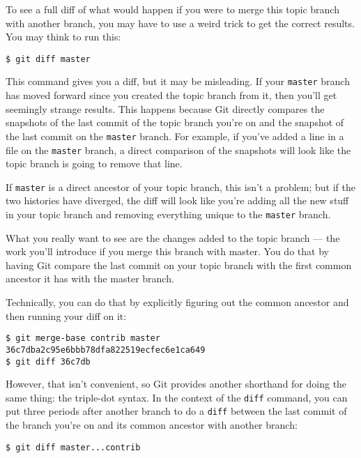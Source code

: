 \documentclass[a4paper]{book}
\begin{document}
To see a full diff of what would happen if you were to merge this topic branch with another branch, you may have to use a weird trick to get the correct results. You may think to run this:

\begin{shaded}\begin{verbatim}
$ git diff master
\end{verbatim}\end{shaded}

This command gives you a diff, but it may be misleading. If your \texttt{master} branch has moved forward since you created the topic branch from it, then you'll get seemingly strange results. This happens because Git directly compares the snapshots of the last commit of the topic branch you're on and the snapshot of the last commit on the \texttt{master} branch. For example, if you've added a line in a file on the \texttt{master} branch, a direct comparison of the snapshots will look like the topic branch is going to remove that line.

If \texttt{master} is a direct ancestor of your topic branch, this isn't a problem; but if the two histories have diverged, the diff will look like you're adding all the new stuff in your topic branch and removing everything unique to the \texttt{master} branch.

What you really want to see are the changes added to the topic branch --- the work you'll introduce if you merge this branch with master. You do that by having Git compare the last commit on your topic branch with the first common ancestor it has with the master branch.

Technically, you can do that by explicitly figuring out the common ancestor and then running your diff on it:

\begin{shaded}\begin{verbatim}
$ git merge-base contrib master
36c7dba2c95e6bbb78dfa822519ecfec6e1ca649
$ git diff 36c7db
\end{verbatim}\end{shaded}

However, that isn't convenient, so Git provides another shorthand for doing the same thing: the triple-dot syntax. In the context of the \texttt{diff} command, you can put three periods after another branch to do a \texttt{diff} between the last commit of the branch you're on and its common ancestor with another branch:

\begin{shaded}\begin{verbatim}
$ git diff master...contrib
\end{verbatim}\end{shaded}
\end{document}
